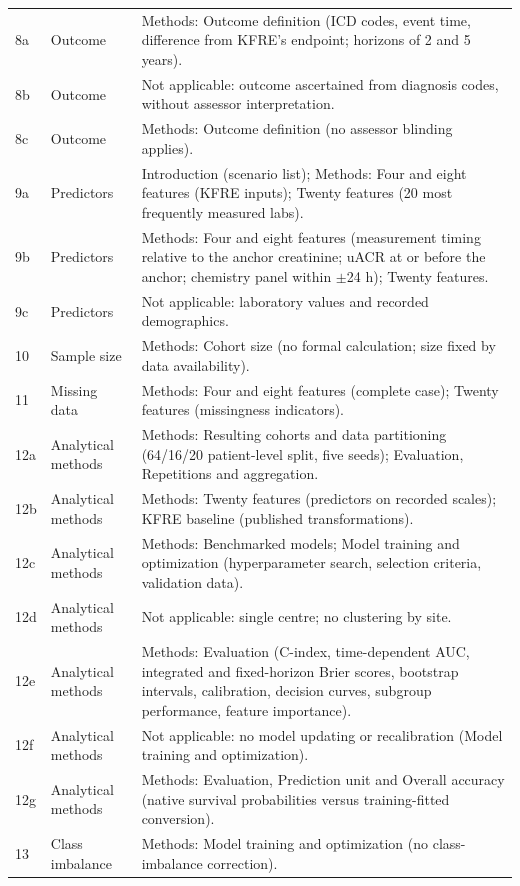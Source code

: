 \documentclass[9pt]{extarticle}
\begin{document}
\begin{longtable}{@{}p{}p{}p{}@{}}
8a & Outcome & Methods: Outcome definition (ICD codes, event time, difference from KFRE's endpoint; horizons of 2 and 5 years). \\
8b & Outcome & Not applicable: outcome ascertained from diagnosis codes, without assessor interpretation. \\
8c & Outcome & Methods: Outcome definition (no assessor blinding applies). \\
9a & Predictors & Introduction (scenario list); Methods: Four and eight features (KFRE inputs); Twenty features (20 most frequently measured labs). \\
9b & Predictors & Methods: Four and eight features (measurement timing relative to the anchor creatinine; uACR at or before the anchor; chemistry panel within $\pm$24 h); Twenty features. \\
9c & Predictors & Not applicable: laboratory values and recorded demographics. \\
10 & Sample size & Methods: Cohort size (no formal calculation; size fixed by data availability). \\
11 & Missing data & Methods: Four and eight features (complete case); Twenty features (missingness indicators). \\
12a & Analytical methods & Methods: Resulting cohorts and data partitioning (64/16/20 patient-level split, five seeds); Evaluation, Repetitions and aggregation. \\
12b & Analytical methods & Methods: Twenty features (predictors on recorded scales); KFRE baseline (published transformations). \\
12c & Analytical methods & Methods: Benchmarked models; Model training and optimization (hyperparameter search, selection criteria, validation data). \\
12d & Analytical methods & Not applicable: single centre; no clustering by site. \\
12e & Analytical methods & Methods: Evaluation (C-index, time-dependent AUC, integrated and fixed-horizon Brier scores, bootstrap intervals, calibration, decision curves, subgroup performance, feature importance). \\
12f & Analytical methods & Not applicable: no model updating or recalibration (Model training and optimization). \\
12g & Analytical methods & Methods: Evaluation, Prediction unit and Overall accuracy (native survival probabilities versus training-fitted conversion). \\
13 & Class imbalance & Methods: Model training and optimization (no class-imbalance correction). \\

\end{longtable}
\end{document}
